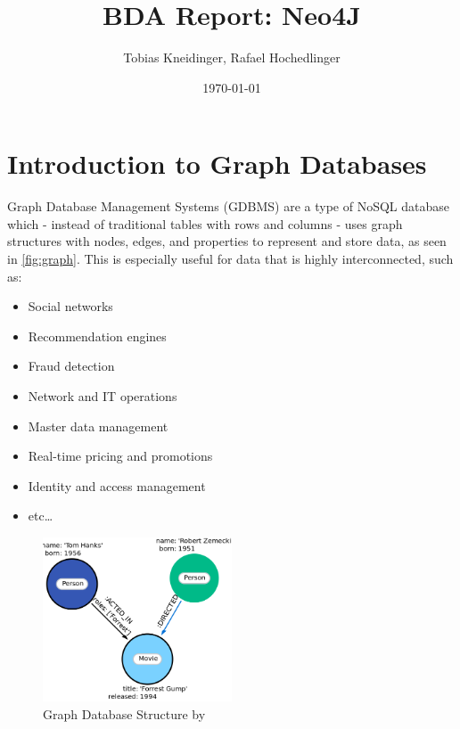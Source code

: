 \documentclass[english,smartquotes,apa]{hgbreport}
\begin{document}

\author{Tobias Kneidinger, Rafael Hochedlinger}                      %
\title{BDA Report: Neo4J} %
\date{\today}

\maketitle



\section*{Introduction to Graph Databases}

Graph Database Management Systems (GDBMS) are a type of NoSQL database which - instead of traditional tables with rows and columns - uses graph structures with nodes, edges, and properties to represent and store data, as seen in \autoref{fig:graph}. This is especially useful for data that is highly interconnected, such as:

\begin{itemize}
	\item Social networks
	\item Recommendation engines
	\item Fraud detection
	\item Network and IT operations
	\item Master data management
	\item Real-time pricing and promotions
	\item Identity and access management
	\item etc\dots
\end{itemize}

\begin{figure}[h]
	\centering
	\includegraphics[width=0.5\textwidth]{graphdb.png}
	\caption{Graph Database Structure by \cite{neo4j}}
	\label{fig:graph}
\end{figure}
\end{document}
